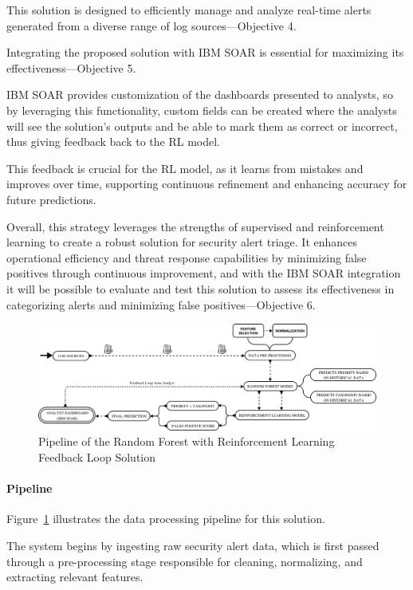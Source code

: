 This solution is designed to efficiently manage and analyze real-time alerts generated from a diverse range of log sources—Objective 4.

Integrating the proposed solution with IBM SOAR is essential for maximizing its effectiveness—Objective 5. 

IBM SOAR provides customization of the dashboards presented to analysts, so by leveraging this functionality, custom fields can be created where the analysts will see the solution's outputs and be able to mark them as correct or incorrect, thus giving feedback back to the RL model.

This feedback is crucial for the RL model, as it learns from mistakes and improves over time, supporting continuous refinement and enhancing accuracy for future predictions.

Overall, this strategy leverages the strengths of supervised and reinforcement learning to create a robust solution for security alert triage. It enhances operational efficiency and threat response capabilities by minimizing false positives through continuous improvement, and with the IBM SOAR integration it will be possible to evaluate and test this solution to assess its effectiveness in categorizing alerts and minimizing false positives—Objective 6.

\begin{figure}[h]
    \centering
    \includegraphics[width=\textwidth]{ch3/assets/solution1_pipeline.png}
    \caption{Pipeline of the Random Forest with Reinforcement Learning Feedback Loop Solution}
    \label{fig:solution1_pipeline}
\end{figure}

\paragraph{Pipeline}

Figure~\ref{fig:solution1_pipeline} illustrates the data processing pipeline for this solution. 

The system begins by ingesting raw security alert data, which is first passed through a pre-processing stage responsible for cleaning, normalizing, and extracting relevant features. 

